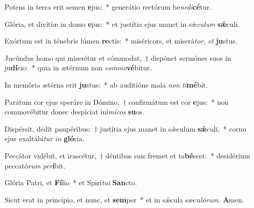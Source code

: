 \item Potens in terra erit semen \textbf{e}jus:~* generátio rectórum be\tinyhspace\textit{nedi}\textbf{cé}tur.
\item Glória, et divítiæ in domo \textbf{e}jus:~* et justítia ejus manet in sǽ\tinyhspace\textit{culum} \textbf{sǽ}culi.
\item Exórtum est in ténebris lúmen \textbf{re}ctis:~* miséricors, et miserá\tinyhspace\textit{tor,} \textit{et} \textbf{ju}stus.
\item Jucúndus homo qui miserétur et cómmodat,~† dispónet sermónes suos in ju\textbf{dí}cio:~* quia in ætérnum non \textit{commo}\textbf{vé}bitur.
\item In memória ætérna erit \textbf{ju}stus:~* ab auditióne mala \textit{non} \textit{ti}\textbf{mé}bit.
\item Parátum cor ejus speráre in Dómino,~† confirmátum est cor \textbf{e}jus:~* non commovébitur donec despíciat ini\textit{mícos} \textbf{su}os.
\item Dispérsit, dedit paupéribus:~† justítia ejus manet in sǽculum \textbf{sǽ}culi,~* cornu ejus exaltábi\tinyhspace\textit{tur} \textit{in} \textbf{gló}ria.
\item Peccátor vidébit, et irascétur,~† déntibus suis fremet et ta\textbf{bé}scet:~* desidérium peccató\textit{rum} \textit{per}\textbf{í}bit.
\item Glória Patri, et \textbf{Fí}lio~* et Spirí\tinyhspace\textit{tui} \textbf{San}cto.
\item Sicut erat in princípio, et nunc, et \textbf{sem}per~* et in sǽcula sæcu\tinyhspace\textit{lórum.} \textbf{A}men.